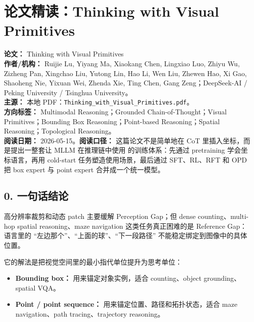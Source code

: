 
\section{论文精读：Thinking with Visual Primitives}

\begin{conceptbox}
\textbf{论文：} Thinking with Visual Primitives\\
\textbf{作者/机构：} Ruijie Lu, Yiyang Ma, Xiaokang Chen, Lingxiao Luo, Zhiyu Wu, Zizheng Pan, Xingchao Liu, Yutong Lin, Hao Li, Wen Liu, Zhewen Hao, Xi Gao, Shaoheng Nie, Yixuan Wei, Zhenda Xie, Ting Chen, Gang Zeng；DeepSeek-AI / Peking University / Tsinghua University。\\
\textbf{主源：} 本地 PDF：\texttt{Thinking\_with\_Visual\_Primitives.pdf}。\\
\textbf{方向标签：} Multimodal Reasoning；Grounded Chain-of-Thought；Visual Primitives；Bounding Box Reasoning；Point-based Reasoning；Spatial Reasoning；Topological Reasoning。\\
\textbf{阅读日期：} 2026-05-15。\textbf{阅读口径：} 这篇论文不是简单地在 CoT 里插入坐标，而是提出一整套让 MLLM 在推理链中使用  的训练体系：先通过 pretraining 学会坐标语言，再用 cold-start 任务塑造使用场景，最后通过 SFT、RL、RFT 和 OPD 把 box expert 与 point expert 合并成一个统一模型。
\end{conceptbox}

\subsection{0. 一句话结论}

 高分辨率裁剪和动态 patch 主要缓解 Perception Gap；但 dense counting、multi-hop spatial reasoning、maze navigation 这类任务真正困难的是 Reference Gap：语言里的 ``左边那个''、``上面的球''、``下一段路径'' 不能稳定绑定到图像中的具体位置。

它的解法是把视觉空间里的最小指代单位提升为思考单位：

\begin{itemize}[leftmargin=1.5em]
  \item \textbf{Bounding box：} 用来锚定对象实例，适合 counting、object grounding、spatial VQA。
  \item \textbf{Point / point sequence：} 用来锚定位置、路径和拓扑状态，适合 maze navigation、path tracing、trajectory reasoning。
\end{itemize}

